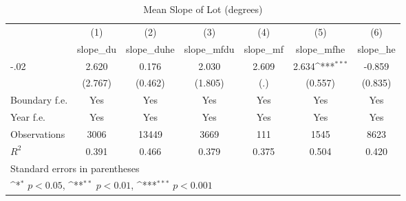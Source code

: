 \begin{table}[htbp]\centering
\def\sym#1{\ifmmode^{#1}\else\(^{#1}\)\fi}
\caption{Mean Slope of Lot (degrees)}
\begin{tabular}{l*{6}{c}}
\hline\hline
                    &\multicolumn{1}{c}{(1)}&\multicolumn{1}{c}{(2)}&\multicolumn{1}{c}{(3)}&\multicolumn{1}{c}{(4)}&\multicolumn{1}{c}{(5)}&\multicolumn{1}{c}{(6)}\\
                    &\multicolumn{1}{c}{slope\_du}&\multicolumn{1}{c}{slope\_duhe}&\multicolumn{1}{c}{slope\_mfdu}&\multicolumn{1}{c}{slope\_mf}&\multicolumn{1}{c}{slope\_mfhe}&\multicolumn{1}{c}{slope\_he}\\
\hline
-.02                &       2.620         &       0.176         &       2.030         &       2.609         &       2.634\sym{***}&      -0.859         \\
                    &     (2.767)         &     (0.462)         &     (1.805)         &         (.)         &     (0.557)         &     (0.835)         \\
[1em]
Boundary f.e.       &         Yes         &         Yes         &         Yes         &         Yes         &         Yes         &         Yes         \\
[1em]
Year f.e.           &         Yes         &         Yes         &         Yes         &         Yes         &         Yes         &         Yes         \\
\hline
Observations        &        3006         &       13449         &        3669         &         111         &        1545         &        8623         \\
\(R^{2}\)           &       0.391         &       0.466         &       0.379         &       0.375         &       0.504         &       0.420         \\
\hline\hline
\multicolumn{7}{l}{\footnotesize Standard errors in parentheses}\\
\multicolumn{7}{l}{\footnotesize \sym{*} \(p<0.05\), \sym{**} \(p<0.01\), \sym{***} \(p<0.001\)}\\
\end{tabular}
\end{table}

